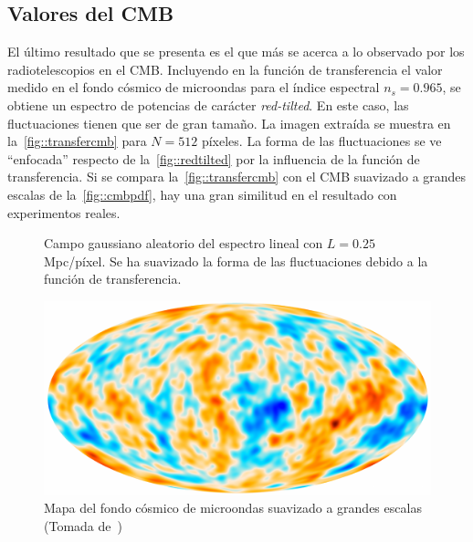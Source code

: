 \subsection{Valores del CMB}
El último resultado que se presenta es el que más se acerca a lo observado por los radiotelescopios en el CMB. Incluyendo en la función de transferencia el valor medido en el fondo cósmico de microondas para el índice espectral \(n_s=0.965\), se obtiene un espectro de potencias de carácter \textit{red-tilted}. En este caso, las fluctuaciones tienen que ser de gran tamaño. La imagen extraída se muestra en la~\autoref{fig::transfercmb} para \(N=512\) píxeles. La forma de las fluctuaciones se ve ``enfocada'' respecto de la~\autoref{fig::redtilted} por la influencia de la función de transferencia. Si se compara la~\autoref{fig::transfercmb} con el CMB suavizado a grandes escalas de la~\autoref{fig::cmbpdf}, hay una gran similitud en el resultado con experimentos reales.
\begin{figure}[ht]
    \centering
    \scalebox{.85}{}
    \caption[Valores del CMB \(N=512\) píxeles y \(L=0.25\) Mpc/píxel]{Campo gaussiano aleatorio del espectro lineal con \(L=0.25\) Mpc/píxel. Se ha suavizado la forma de las fluctuaciones debido a la función de transferencia.}
    \label{fig::transfercmb}
\end{figure}
\begin{figure}[t]
    \centering
    \includegraphics[scale=.6]{img/Planck_2018_Pol_CMB.pdf}
    \caption[Mapa del fondo cósmico de microondas a grandes escalas]{Mapa del fondo cósmico de microondas suavizado a grandes escalas (Tomada de~\cite{collaboration2020planck4})}
    \label{fig::cmbpdf}
\end{figure}
